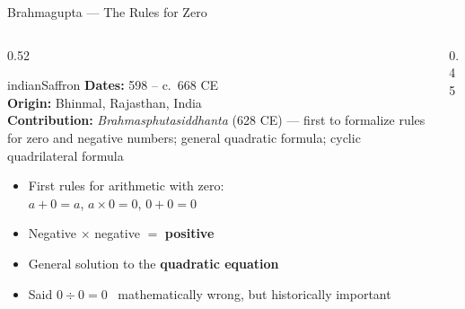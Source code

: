 \begin{frame}[shrink=12]{Brahmagupta --- The Rules for Zero}

  \begin{columns}[T]
    \begin{column}{0.52\textwidth}
      \begin{personbox}[Brahmagupta]{indianSaffron}
        \small
        \textbf{Dates:} 598 -- c.\ 668 CE\\
        \textbf{Origin:} Bhinmal, Rajasthan, India\\
        \textbf{Contribution:} \emph{Brahmasphutasiddhanta} (628 CE) --- first to
        formalize rules for zero and negative numbers; general quadratic formula;
        cyclic quadrilateral formula
      \end{personbox}

      \vspace{0.3em}
      \begin{itemize}
        \item \alert{First rules for arithmetic with zero:}\\
          $a + 0 = a$, \quad $a \times 0 = 0$, \quad $0 + 0 = 0$
        \item Negative $\times$ negative $=$ \textbf{positive}
        \item General solution to the \textbf{quadratic equation}
        \item Said $0 \div 0 = 0$ \textrightarrow\ mathematically wrong, but historically important
      \end{itemize}
    \end{column}

    \begin{column}{0.45\textwidth}

      \vspace{0.3em}
    \end{column}
  \end{columns}

\end{frame}

